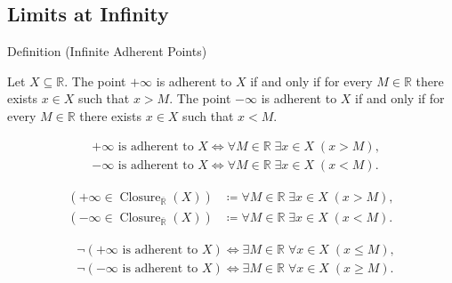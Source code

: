 
\subsection*{Limits at Infinity}
\label{sec:limits-at-infinity}
\begin{definitionbox}{Definition (Infinite Adherent Points)}
\begin{definition}
\label{def:infinite-adherent-points}
Let $X\subseteq\mathbb{R}$. The point $+\infty$ is adherent to $X$ if
and only if for every $M\in\mathbb{R}$ there exists $x\in X$ such that
$x>M$. The point $-\infty$ is adherent to $X$ if and only if for every
$M\in\mathbb{R}$ there exists $x\in X$ such that $x<M$.
\end{definition}
\end{definitionbox}

\begin{remark*}
\[
\begin{aligned}
&+\infty\text{ is adherent to }X
\Longleftrightarrow
\forall M\in\mathbb{R}\;\exists x\in X\;(x>M),\\
&-\infty\text{ is adherent to }X
\Longleftrightarrow
\forall M\in\mathbb{R}\;\exists x\in X\;(x<M).
\end{aligned}
\]
\end{remark*}

\begin{remark*}
\[
\begin{aligned}
\left(+\infty\in\operatorname{Closure}_{\overline{\mathbb{R}}}(X)\right)
&\coloneqq
\forall M\in\mathbb{R}\;\exists x\in X\;(x>M),\\
\left(-\infty\in\operatorname{Closure}_{\overline{\mathbb{R}}}(X)\right)
&\coloneqq
\forall M\in\mathbb{R}\;\exists x\in X\;(x<M).
\end{aligned}
\]
\end{remark*}

\begin{remark*}
\[
\begin{aligned}
&\neg(+\infty\text{ is adherent to }X)
\Longleftrightarrow
\exists M\in\mathbb{R}\;\forall x\in X\;(x\le M),\\
&\neg(-\infty\text{ is adherent to }X)
\Longleftrightarrow
\exists M\in\mathbb{R}\;\forall x\in X\;(x\ge M).
\end{aligned}
\]
\end{remark*}

